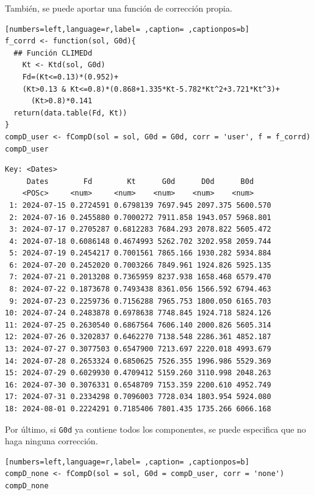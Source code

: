 \begin{itemize}
También, se puede aportar una función de corrección propia.
\begin{lstlisting}[numbers=left,language=r,label= ,caption= ,captionpos=b]
f_corrd <- function(sol, G0d){
  ## Función CLIMEDd
    Kt <- Ktd(sol, G0d)
    Fd=(Kt<=0.13)*(0.952)+
    (Kt>0.13 & Kt<=0.8)*(0.868+1.335*Kt-5.782*Kt^2+3.721*Kt^3)+
      (Kt>0.8)*0.141
  return(data.table(Fd, Kt))
}
compD_user <- fCompD(sol = sol, G0d = G0d, corr = 'user', f = f_corrd)
compD_user
\end{lstlisting}

\begin{verbatim}
Key: <Dates>
	 Dates        Fd        Kt      G0d      D0d      B0d
	<POSc>     <num>     <num>    <num>    <num>    <num>
 1: 2024-07-15 0.2724591 0.6798139 7697.945 2097.375 5600.570
 2: 2024-07-16 0.2455880 0.7000272 7911.858 1943.057 5968.801
 3: 2024-07-17 0.2705287 0.6812283 7684.293 2078.822 5605.472
 4: 2024-07-18 0.6086148 0.4674993 5262.702 3202.958 2059.744
 5: 2024-07-19 0.2454217 0.7001561 7865.166 1930.282 5934.884
 6: 2024-07-20 0.2452020 0.7003266 7849.961 1924.826 5925.135
 7: 2024-07-21 0.2013208 0.7365959 8237.938 1658.468 6579.470
 8: 2024-07-22 0.1873678 0.7493438 8361.056 1566.592 6794.463
 9: 2024-07-23 0.2259736 0.7156288 7965.753 1800.050 6165.703
10: 2024-07-24 0.2483878 0.6978638 7748.845 1924.718 5824.126
11: 2024-07-25 0.2630540 0.6867564 7606.140 2000.826 5605.314
12: 2024-07-26 0.3202837 0.6462270 7138.548 2286.361 4852.187
13: 2024-07-27 0.3077503 0.6547900 7213.697 2220.018 4993.679
14: 2024-07-28 0.2653324 0.6850625 7526.355 1996.986 5529.369
15: 2024-07-29 0.6029930 0.4709412 5159.260 3110.998 2048.263
16: 2024-07-30 0.3076331 0.6548709 7153.359 2200.610 4952.749
17: 2024-07-31 0.2334298 0.7096003 7728.034 1803.954 5924.080
18: 2024-08-01 0.2224291 0.7185406 7801.435 1735.266 6066.168
\end{verbatim}

Por último, si \texttt{G0d} ya contiene todos los componentes, se puede especifica que no haga ninguna corrección.
\begin{lstlisting}[numbers=left,language=r,label= ,caption= ,captionpos=b]
compD_none <- fCompD(sol = sol, G0d = compD_user, corr = 'none')
compD_none
\end{lstlisting}


\end{itemize}
